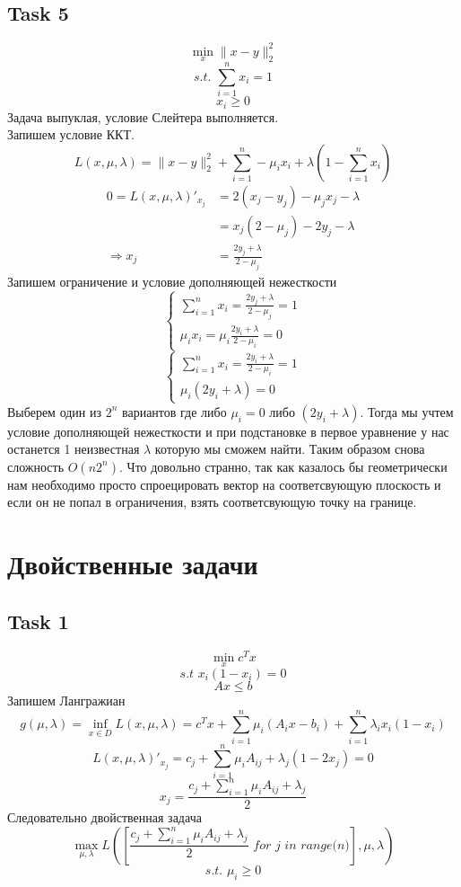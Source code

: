 \documentclass[12pt]{exam}
\begin{document}
\subsection*{Task 5}
$$ \min_{x} \| x - y \|_2^2 $$
$$ \textit{s.t. } \sum_{i=1}^n x_i = 1$$
$$ x_i \geq 0$$
Задача выпуклая, условие Слейтера выполняется. \\
Запишем условие ККТ.\\
$$ 
L(x, \mu, \lambda) = 
\| x - y \|_2^2 + 
\sum_{i=1}^n -\mu_i x_i + 
\lambda \left(1 - \sum_{i=1}^n x_i\right)
$$
\begin{align*}
    0 = L(x, \mu, \lambda)'_{x_j} 
        &= 2(x_j - y_j) -\mu_j x_j - \lambda \\
        &= x_j (2 - \mu_j) - 2y_j - \lambda \\
    \Rightarrow
        x_j &= \frac{2 y_j + \lambda}{2 - \mu_j}
\end{align*} 
Запишем ограничение и условие дополняющей нежесткости
\begin{equation*}
    \begin{cases}
        \sum_{i=1}^n x_i = \frac{2 y_j + \lambda}{2 - \mu_j} = 1 \\
        \mu_i x_i = \mu_i\frac{2 y_i + \lambda}{2 - \mu_i} = 0
    \end{cases}
\end{equation*}
\begin{equation*}
    \begin{cases}
        \sum_{i=1}^n x_i = \frac{2 y_i + \lambda}{2 - \mu_i} = 1 \\
        \mu_i (2 y_i + \lambda) = 0
    \end{cases}
\end{equation*}
Выберем один из $2^n$ вариантов где либо $\mu_i = 0$ либо $(2y_i + \lambda)$.
Тогда мы учтем условие дополняющей нежесткости и при подстановке в первое уравнение у нас останется 1 неизвестная $\lambda$ которую мы сможем найти.
Таким образом снова сложность $O(n 2^n)$. 
Что довольно странно, 
так как казалось бы геометрически нам необходимо 
просто спроецировать вектор на соответсвующую плоскость 
и если он не попал в ограничения, взять соответсвующую точку на границе.

\section*{Двойственные задачи}
\subsection*{Task 1}
$$ \min_{x} c^T x$$
$$ \textit{s.t } x_i (1 - x_i) = 0$$
$$ Ax \leq b$$
Запишем Лангражиан
$$
g(\mu, \lambda) = \inf_{x \in D} L(x, \mu, \lambda) = 
c^T x + 
\sum_{i=1}^n \mu_i (A_ix - b_i) + 
\sum_{i=1}^n \lambda_i x_i (1 - x_i)
$$
$$
L(x, \mu, \lambda)'_{x_j} = 
c_j + \sum_{i=1}^n \mu_i A_{ij} + \lambda_j (1 - 2x_j) = 0
$$
$$ 
x_j = \frac{c_j + \sum_{i=1}^n \mu_i A_{ij} + \lambda_j}{2}
$$
Следовательно двойственная задача 
$$
\max_{\mu, \lambda} L([\frac{c_j + \sum_{i=1}^n \mu_i A_{ij} + \lambda_j}{2} \textit{ for j in range(n)}], \mu, \lambda)
$$
$$
\textit{s.t. } \mu_i \geq 0
$$
\end{document}

